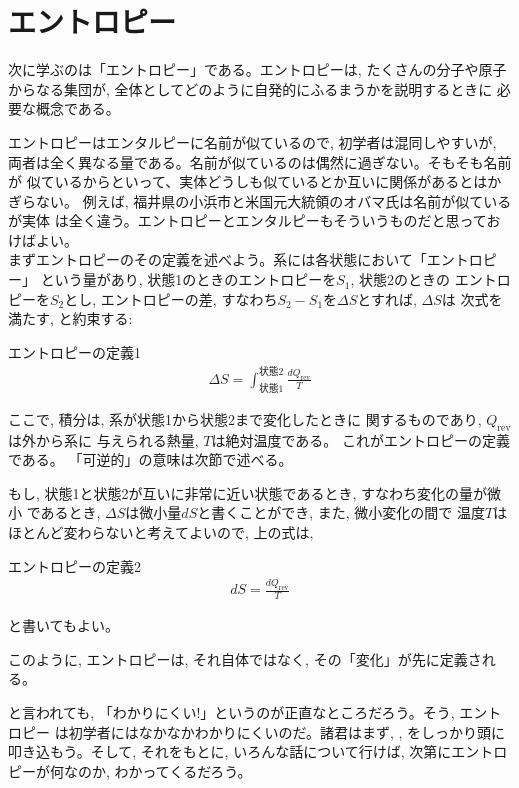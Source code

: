 \section{エントロピー}

次に学ぶのは「エントロピー」である。エントロピーは, たくさんの分子や原子
からなる集団が, 全体としてどのように自発的にふるまうかを説明するときに
必要な概念である。

エントロピーはエンタルピーに名前が似ているので, 初学者は混同しやすいが, 
両者は全く異なる量である。名前が似ているのは偶然に過ぎない。そもそも名前が
似ているからといって、実体どうしも似ているとか互いに関係があるとはかぎらない。
例えば, 福井県の小浜市と米国元大統領のオバマ氏は名前が似ているが実体
は全く違う。エントロピーとエンタルピーもそういうものだと思っておけばよい。\\

まずエントロピーのその定義を述べよう。系には各状態において「エントロピー」
という量があり, 状態1のときのエントロピーを$S_1$, 状態2のときの
エントロピーを$S_2$とし, 
エントロピーの差, すなわち$S_2-S_1$を$\Delta S$とすれば, $\Delta S$は
次式を満たす, と約束する:
\begin{itembox}{エントロピーの定義1}
\begin{eqnarray}
\Delta S=\int_{\text{状態1}}^{\text{状態2}} \frac{dQ_{\text{rev}}}{T}\label{eq:def_entropy}
\end{eqnarray}
\end{itembox}
ここで, 積分は, 系が状態1から状態2まで変化したときに
関するものであり, $Q_{\text{rev}}$は外から系に
与えられる熱量, $T$は絶対温度である。 これがエントロピーの定義である。
「可逆的」の意味は次節で述べる。

もし, 状態1と状態2が互いに非常に近い状態であるとき, すなわち変化の量が微小
であるとき, $\Delta S$は微小量$dS$と書くことができ, また, 微小変化の間で
温度$T$はほとんど変わらないと考えてよいので, 上の式は, 
\begin{itembox}{エントロピーの定義2}
\begin{eqnarray}
dS=\frac{dQ_{\text{rev}}}{T}\label{eq:def_entropy2}
\end{eqnarray}
\end{itembox}
と書いてもよい。

このように, エントロピーは, それ自体ではなく, その「変化」が先に定義される。

と言われても, 「わかりにくい!」というのが正直なところだろう。そう, エントロピー
は初学者にはなかなかわかりにくいのだ。諸君はまず, , 
をしっかり頭に叩き込もう。そして, それをもとに, いろんな話について行けば, 
次第にエントロピーが何なのか, わかってくるだろう。
\hv

